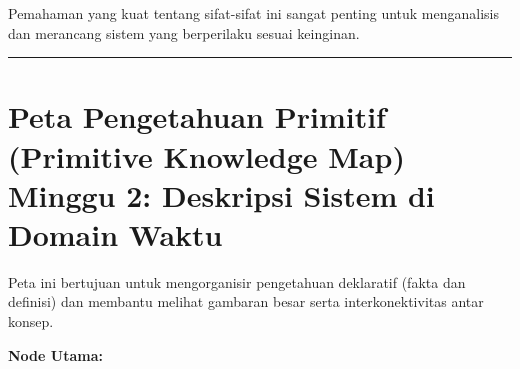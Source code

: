 \documentclass[
  letterpaper,
  DIV=11,
  numbers=noendperiod]{scrreprt}
\begin{document}
Pemahaman yang kuat tentang sifat-sifat ini sangat penting untuk
menganalisis dan merancang sistem yang berperilaku sesuai keinginan.

\begin{center}\rule{0.5\linewidth}{0.5pt}\end{center}

\section{Peta Pengetahuan Primitif (Primitive Knowledge Map) Minggu 2:
Deskripsi Sistem di Domain
Waktu}\label{peta-pengetahuan-primitif-primitive-knowledge-map-minggu-2-deskripsi-sistem-di-domain-waktu}

Peta ini bertujuan untuk mengorganisir pengetahuan deklaratif (fakta dan
definisi) dan membantu melihat gambaran besar serta interkonektivitas
antar konsep.

\textbf{Node Utama:}
\end{document}
